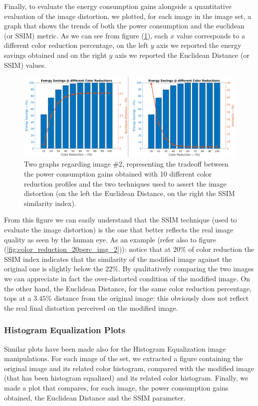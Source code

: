 \documentclass[a4paper]{article}
\begin{document}
            Finally, to evaluate the energy consumption gains alongside a quantitative evaluation of the image distortion, we plotted, for each image in the image set, a graph that shows the trends of both the power consumption and the euclidean (or SSIM) metric. As we can see from figure (\ref{fig:img2_EUCLvSSIM}), each $x$ value corresponds to a different color reduction percentage, on the left $y$ axis we reported the energy savings obtained and on the right $y$ axis we reported the Euclidean Distance (or SSIM) values.

            \begin{figure}[htp]
                \centering
                \includegraphics[width=0.8 \columnwidth]{./screenshots/img2_EUCLvSSIM.png}
                \caption{
                        \label{fig:img2_EUCLvSSIM}
                        Two graphs regarding image \#2, representing the tradeoff between the power consumption gains obtained with 10 different color reduction profiles and the two techniques used to assert the image distortion (on the left the Euclidean Distance, on the right the SSIM similarity index).
                }
            \end{figure}

            From this figure we can easily understand that the SSIM technique (used to evaluate the image distortion) is the one that better reflects the real image quality as seen by the human eye. As an example (refer also to figure (\ref{fig:color_reduction_20perc_img_2})): notice that at $20\%$ of color reduction the SSIM index indicates that the similarity of the modified image against the original one is slightly below the $22\%$. By qualitatively comparing the two images we can appreciate in fact the over-distorted condition of the modified image. On the other hand, the Euclidean Distance, for the same color reduction percentage, tops at a $3.45\%$ distance from the original image: this obviously does not reflect the real final distortion perceived on the modified image.

        \subsubsection{Histogram Equalization Plots}
            Similar plots have been made also for the Histogram Equalization image manipulations. For each image of the set, we extracted a figure containing the original image and its related color histogram, compared with the modified image (that has been histogram equalized) and its related color histogram.
            Finally, we made a plot that compares, for each image, the power consumption gains obtained, the Euclidean Distance and the SSIM parameter.
\end{document}
